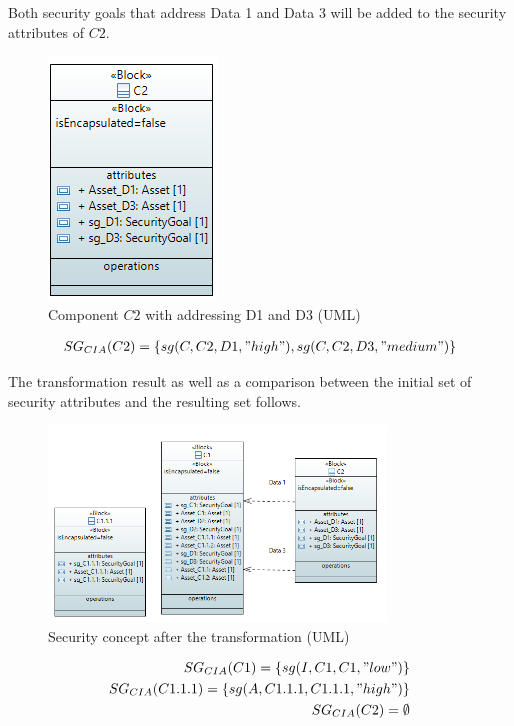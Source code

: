Both security goals that address Data 1 and Data 3 will be added to the security attributes of $C2$.

\begin{figure}[H]
\centering
        \includegraphics[scale=0.9]{pictures/block_c2_final}
    \caption{Component $C2$ with addressing D1 and D3 (UML)}
\end{figure}

\begin{align*}
SG_{CIA}(C2) = \{sg(C,C2,D1,"high"), sg(C,C2,D3,"medium")\}
\end{align*}

The transformation result as well as a comparison between the initial set of security attributes and the resulting set follows.

\begin{figure}[H]
\centering
\includegraphics[width=0.8\textwidth]{pictures/block_final_trans}
\caption{Security concept after the transformation (UML)}
\end{figure} 


\begin{align*}
SG_{CIA}(C1) = \{sg(I,C1,C1,"low")\}\\
SG_{CIA}(C1.1.1) = \{sg(A,C1.1.1,C1.1.1,"high")\}\\
SG_{CIA}(C2) = \emptyset
\end{align*}

